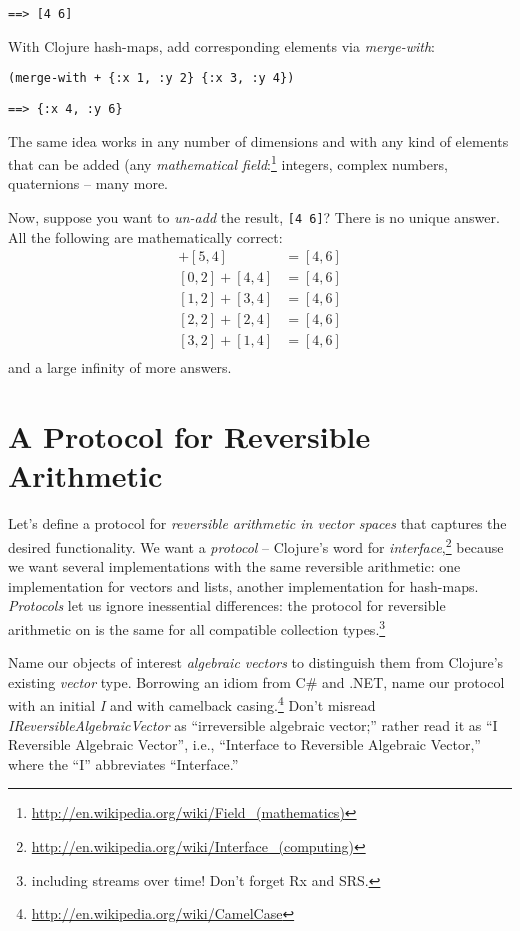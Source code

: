 \documentclass[11pt]{article}
\begin{document}
\begin{verbatim}
==> [4 6]
\end{verbatim}

With Clojure hash-maps, add corresponding elements via \emph{merge-with}:
\begin{verbatim}
(merge-with + {:x 1, :y 2} {:x 3, :y 4})
\end{verbatim}

\begin{verbatim}
==> {:x 4, :y 6}
\end{verbatim}

The same idea works in any number of dimensions and with any kind of
elements that can be added (any \emph{mathematical
field}:\footnote{\url{http://en.wikipedia.org/wiki/Field_(mathematics)}}
integers, complex numbers, quaternions -- many more.

Now, suppose you want to \emph{un-add} the result, \verb|[4 6]|? There is
no unique answer.  All the following are mathematically correct:
\begin{align*}
[-1, 2] + [5, 4] &= [4, 6] \\
[ 0, 2] + [4, 4] &= [4, 6] \\
[ 1, 2] + [3, 4] &= [4, 6] \\
[ 2, 2] + [2, 4] &= [4, 6] \\
[ 3, 2] + [1, 4] &= [4, 6] \\
\end{align*}
and a large infinity of more answers.
\section{A Protocol for Reversible Arithmetic}
\label{sec-3}

Let's define a protocol for \emph{reversible arithmetic in vector spaces}
that captures the desired functionality.  We want a \emph{protocol} --
Clojure's word for
\emph{interface},\footnote{\url{http://en.wikipedia.org/wiki/Interface_(computing)}}
because we want several implementations with the same reversible
arithmetic: one implementation for vectors and lists, another
implementation for hash-maps.  \emph{Protocols} let us ignore inessential
differences: the protocol for reversible arithmetic on is the same for
all compatible collection
types.\footnote{including streams over time! Don't forget Rx and SRS.}

Name our objects of interest \emph{algebraic vectors} to distinguish them
from Clojure's existing \emph{vector} type. Borrowing an idiom from C\# and
.NET, name our protocol with an initial \emph{I} and with camelback
casing.\footnote{\url{http://en.wikipedia.org/wiki/CamelCase}} Don't misread
\emph{IReversibleAlgebraicVector} as ``irreversible algebraic vector;''
rather read it as ``I Reversible Algebraic Vector'', i.e., ``Interface
to Reversible Algebraic Vector,'' where the ``I'' abbreviates
``Interface.''
\end{document}
